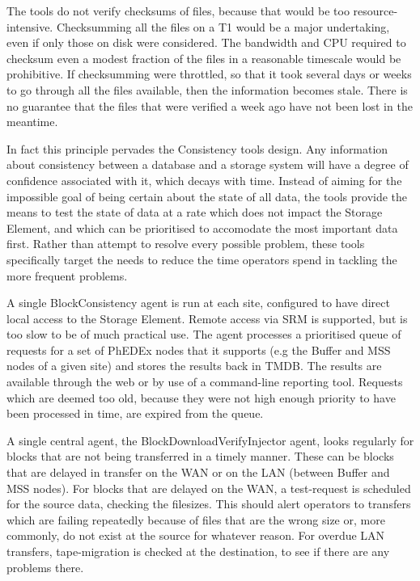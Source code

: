 \documentclass{PoS}
\begin{document}
The tools do not verify checksums of files, because that would be too
resource-intensive. Checksumming all the files on a T1 would be a
major undertaking, even if only those on disk were considered. The
bandwidth and CPU required to checksum even a modest fraction of the
files in a reasonable timescale would be prohibitive. If checksumming
were throttled, so that it took several days or weeks to go through
all the files available, then the information becomes stale. There is
no guarantee that the files that were verified a week ago have not
been lost in the meantime.

In fact this principle pervades the Consistency tools design. Any
information about consistency between a database and a storage system
will have a degree of confidence associated with it, which decays with
time. Instead of aiming for the impossible goal of being certain about
the state of all data, the tools provide the means to test the state
of data at a rate which does not impact the Storage Element, and which
can be prioritised to accomodate the most important data first. Rather
than attempt to resolve every possible problem, these tools
specifically target the needs to reduce the time operators spend in
tackling the more frequent problems.

A single BlockConsistency agent is run at each site, configured to
have direct local access to the Storage Element. Remote access via SRM
is supported, but is too slow to be of much practical use. The agent
processes a prioritised queue of requests for a set of PhEDEx nodes
that it supports (e.g the Buffer and MSS nodes of a given site) and
stores the results back in TMDB. The results are available through the
web or by use of a command-line reporting tool. Requests which are
deemed too old, because they were not high enough priority to have
been processed in time, are expired from the queue.

A single central agent, the BlockDownloadVerifyInjector agent, looks
regularly for blocks that are not being transferred in a timely
manner. These can be blocks that are delayed in transfer on the WAN or
on the LAN (between Buffer and MSS nodes). For blocks that are delayed
on the WAN, a test-request is scheduled for the source data, checking
the filesizes. This should alert operators to transfers which are
failing repeatedly because of files that are the wrong size or, more
commonly, do not exist at the source for whatever reason. For overdue
LAN transfers, tape-migration is checked at the destination, to see if
there are any problems there.
\end{document}
